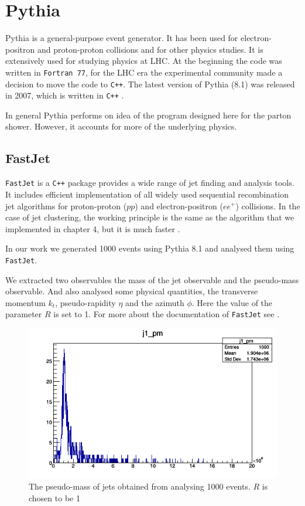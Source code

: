 \chapter{Pythia}
Pythia is a general-purpose event generator. It has been used for electron-positron and proton-proton collisions and for other physics studies. It is extensively used for studying physics at LHC. At the beginning the code was written in \verb+Fortran 77+, for the LHC era the experimental community made a decision to move the code to \verb!C++!. The latest version of Pythia (8.1) was released in 2007, which is written in \verb!C++! \citep{Buckley:2011ms}. 

In general Pythia performs on idea of the program designed here for the parton shower. However, it accounts for more of the underlying physics. 

\section{FastJet} 

\verb+FastJet+ is a \verb!C++! package provides a wide range of jet finding and analysis tools. It includes efficient implementation of all widely used sequential recombination jet algorithms for proton-proton ($pp$) and electron-positron ($ee^+$) collisions. In the case of jet clustering, the working principle is the same as the algorithm that we implemented in chapter 4, but it is much faster \citep{Buckley:2011ms}. 

In our work we generated 1000 events using Pythia 8.1 and analysed them using \verb+FastJet+. 

We extracted two observables the mass of the jet observable and the pseudo-mass observable. And also analysed some physical quantities, the transverse momentum $k_t$, pseudo-rapidity $\eta$ and the azimuth $\phi$. Here the value of the parameter $R$ is set to 1. For more about the documentation of \verb+FastJet+ see \citep{Buckley:2011ms}. 

\begin{figure}[hbtp]
\centering
\includegraphics[scale=.7]{images/Canvas_1.png}
\caption{The pseudo-mass of jets obtained from analysing 1000 events. $R$ is chosen to be 1}
\end{figure}



